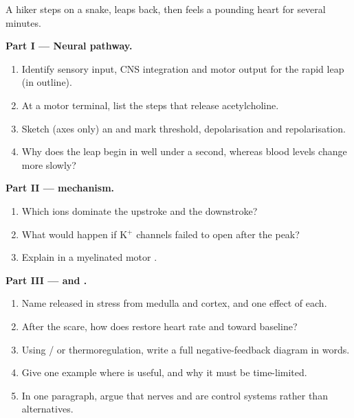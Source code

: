 \begin{problem}
\label{pb:g12:nerves-hormones:1}
A hiker steps on a snake, leaps back, then feels a pounding heart for
several minutes.

\medskip
\noindent\textbf{Part I --- Neural pathway.}
\begin{enumerate}
  \item Identify sensory input, CNS integration and motor output for the
        rapid leap (in outline).
  \item At a motor  terminal, list the steps that release
        acetylcholine.
  \item Sketch (axes only) an  and mark threshold,
        depolarisation and repolarisation.
  \item Why does the leap begin in well under a second, whereas blood
         levels change more slowly?
\end{enumerate}

\medskip
\noindent\textbf{Part II ---  mechanism.}
\begin{enumerate}[resume]
  \item Which ions dominate the upstroke and the downstroke?
  \item What would happen if K$^{+}$ channels failed to open after the
        peak?
  \item Explain  in a myelinated motor .
\end{enumerate}

\medskip
\noindent\textbf{Part III ---  and .}
\begin{enumerate}[resume]
  \item Name  released in stress from  medulla and
        cortex, and one effect of each.
  \item After the scare, how does  restore heart rate
        and  toward baseline?
  \item Using / or thermoregulation, write a full
        negative-feedback diagram in words.
  \item Give one example where  is useful, and why it
        must be time-limited.
  \item In one paragraph, argue that nerves and  are
         control systems rather than alternatives.
\end{enumerate}
\end{problem}
